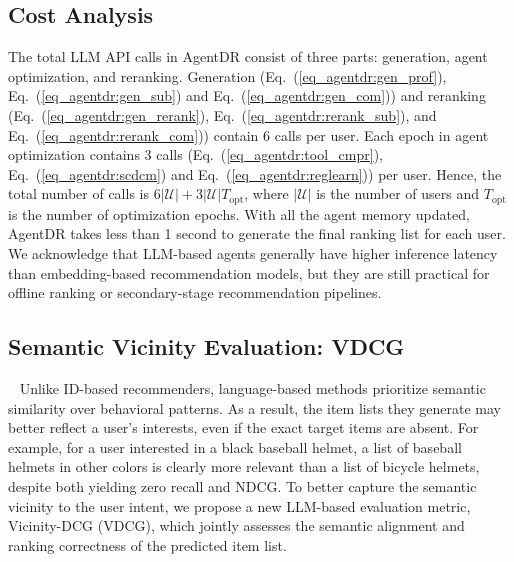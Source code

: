 \subsection{Cost Analysis}
The total LLM API calls in AgentDR consist of three parts: generation, agent optimization, and reranking. 
Generation (Eq.~(\ref{eq_agentdr:gen_prof}), Eq.~(\ref{eq_agentdr:gen_sub}) and Eq.~(\ref{eq_agentdr:gen_com}))
and reranking (Eq.~(\ref{eq_agentdr:gen_rerank}), Eq.~(\ref{eq_agentdr:rerank_sub}), and Eq.~(\ref{eq_agentdr:rerank_com})) contain 6 calls per user. 
Each epoch in agent optimization contains 3 calls (Eq.~(\ref{eq_agentdr:tool_cmpr}), Eq.~(\ref{eq_agentdr:scdcm}) and Eq.~(\ref{eq_agentdr:reglearn})) per user.
Hence, the total number of calls is $6|\mathcal{U}| + 3|\mathcal{U}|T_{\text{opt}}$, where $|\mathcal{U}|$ is the number of users and $T_{\text{opt}}$ is the number of optimization epochs.
With all the agent memory updated, AgentDR takes less than 1 second to generate the final ranking list for each user.
We acknowledge that LLM-based agents generally have higher inference latency than embedding-based recommendation models, but they are still practical for offline ranking or secondary-stage recommendation pipelines.

\subsection{Semantic Vicinity Evaluation: VDCG}~\label{sec:vdcg}
Unlike ID-based recommenders, language-based methods prioritize semantic similarity over behavioral patterns. As a result, the item lists they generate may better reflect a user’s interests, even if the exact target items are absent. For example, for a user interested in a black baseball helmet, a list of baseball helmets in other colors is clearly more relevant than a list of bicycle helmets, despite both yielding zero recall and NDCG. To better capture the semantic vicinity to the user intent, we propose a new LLM-based evaluation metric, Vicinity-DCG (VDCG), which jointly assesses the semantic alignment and ranking correctness of the predicted item list.

